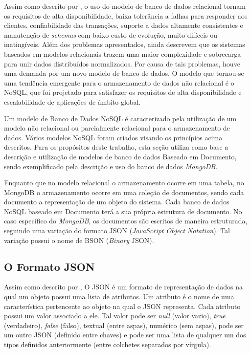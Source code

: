 
Assim como descrito por , o uso do modelo de banco de dados relacional tornam os requisitos de alta disponibilidade, baixa tolerância a falhas para responder aos clientes, confiabilidade das transações, suporte a dados altamente consistentes e manutenção de \textit{schemas} com baixo custo de evolução, muito difíceis ou inatingíveis. Além dos problemas apresentados,  ainda descrevem que os sistemas baseados em modelos relacionais trazem uma maior complexidade e sobrecarga para unir dados distribuídos normalizados. Por causa de tais problemas, houve uma demanda por um novo modelo de banco de dados. O modelo que tornou-se uma tendência emergente para o armazenamento de dados não relacional é o NoSQL, que foi projetado para satisfazer os requisitos de alta disponibilidade e escalabilidade de aplicações de âmbito global.
    
Um modelo de Banco de Dados NoSQL é caracterizado pela utilização de um modelo não relacional ou parcialmente relacional para o armazenamento de dados. Vários modelos NoSQL foram criados visando os princípios acima descritos. Para os propósitos deste trabalho, esta seção utiliza como base a descrição e utilização de modelos de banco de dados Baseado em Documento, sendo exemplificado pela descrição e uso do banco de dados \textit{MongoDB}.

Enquanto que no modelo relacional o armazenamento ocorre em uma tabela, no MongoDB o armazenamento ocorre em uma coleção de documentos, sendo cada documento a representação de um objeto do sistema. Cada banco de dados NoSQL baseado em Documento terá a sua própria estrutura de documento. No caso específico do \textit{MongoDB}, os documentos são escritos de maneira estruturada, seguindo uma variação do formato JSON (\textit{JavaScript Object Notation}). Tal variação possui o nome de BSON (\textit{Binary} JSON).

\subsection{O Formato JSON}
    
Assim como descrito por , O JSON é um formato de representação de dados na qual um objeto possui uma lista de atributos. Um atributo é o nome de uma característica pertencente ao objeto na qual o JSON representa. Cada atributo possui um valor associado a ele. Tal valor pode ser \textit{null} (valor vazio), \textit{true} (verdadeiro), \textit{false} (falso), textual (entre aspas), numérico (sem aspas), pode ser um outro JSON (definido entre chaves) e pode ser uma lista de qualquer um dos tipos definidos anteriormente (entre colchetes separados por vírgula).

